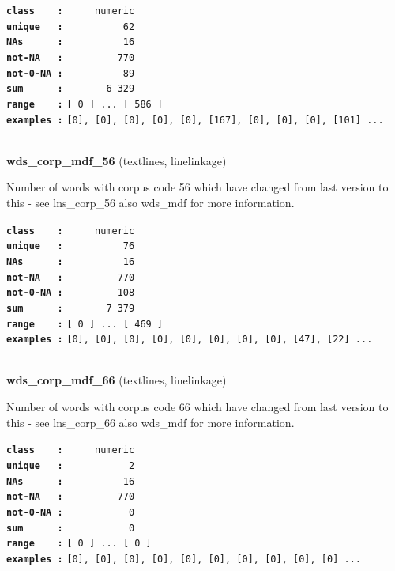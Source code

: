 \documentclass[]{article}
\begin{document}
\textbf{\texttt{class\ \ \ \ :}} \texttt{~~~~~numeric}\\
\textbf{\texttt{unique\ \ \ :}} \texttt{~~~~~~~~~~62}\\
\textbf{\texttt{NAs\ \ \ \ \ \ :}} \texttt{~~~~~~~~~~16}\\
\textbf{\texttt{not-NA\ \ \ :}} \texttt{~~~~~~~~~770}\\
\textbf{\texttt{not-0-NA\ :}} \texttt{~~~~~~~~~~89}\\
\textbf{\texttt{sum\ \ \ \ \ \ :}} \texttt{~~~~~~~6~329}\\
\textbf{\texttt{range\ \ \ \ :}}
\texttt{{[}\ 0\ {]}\ ...\ {[}\ 586\ {]}}\\
\textbf{\texttt{examples\ :}}
\texttt{{[}0{]},\ {[}0{]},\ {[}0{]},\ {[}0{]},\ {[}0{]},\ {[}167{]},\ {[}0{]},\ {[}0{]},\ {[}0{]},\ {[}101{]}\ ...}\\

~

\textbf{wds\_corp\_mdf\_56} (textlines, linelinkage)

Number of words with corpus code 56 which have changed from last version
to this - see lns\_corp\_56 also wds\_mdf for more information.

\textbf{\texttt{class\ \ \ \ :}} \texttt{~~~~~numeric}\\
\textbf{\texttt{unique\ \ \ :}} \texttt{~~~~~~~~~~76}\\
\textbf{\texttt{NAs\ \ \ \ \ \ :}} \texttt{~~~~~~~~~~16}\\
\textbf{\texttt{not-NA\ \ \ :}} \texttt{~~~~~~~~~770}\\
\textbf{\texttt{not-0-NA\ :}} \texttt{~~~~~~~~~108}\\
\textbf{\texttt{sum\ \ \ \ \ \ :}} \texttt{~~~~~~~7~379}\\
\textbf{\texttt{range\ \ \ \ :}}
\texttt{{[}\ 0\ {]}\ ...\ {[}\ 469\ {]}}\\
\textbf{\texttt{examples\ :}}
\texttt{{[}0{]},\ {[}0{]},\ {[}0{]},\ {[}0{]},\ {[}0{]},\ {[}0{]},\ {[}0{]},\ {[}0{]},\ {[}47{]},\ {[}22{]}\ ...}\\

~

\textbf{wds\_corp\_mdf\_66} (textlines, linelinkage)

Number of words with corpus code 66 which have changed from last version
to this - see lns\_corp\_66 also wds\_mdf for more information.

\textbf{\texttt{class\ \ \ \ :}} \texttt{~~~~~numeric}\\
\textbf{\texttt{unique\ \ \ :}} \texttt{~~~~~~~~~~~2}\\
\textbf{\texttt{NAs\ \ \ \ \ \ :}} \texttt{~~~~~~~~~~16}\\
\textbf{\texttt{not-NA\ \ \ :}} \texttt{~~~~~~~~~770}\\
\textbf{\texttt{not-0-NA\ :}} \texttt{~~~~~~~~~~~0}\\
\textbf{\texttt{sum\ \ \ \ \ \ :}} \texttt{~~~~~~~~~~~0}\\
\textbf{\texttt{range\ \ \ \ :}}
\texttt{{[}\ 0\ {]}\ ...\ {[}\ 0\ {]}}\\
\textbf{\texttt{examples\ :}}
\texttt{{[}0{]},\ {[}0{]},\ {[}0{]},\ {[}0{]},\ {[}0{]},\ {[}0{]},\ {[}0{]},\ {[}0{]},\ {[}0{]},\ {[}0{]}\ ...}\\
\end{document}
